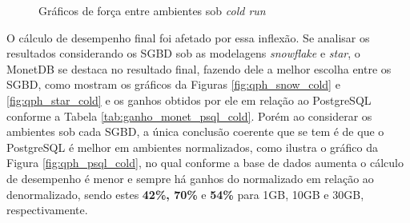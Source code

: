 \begin{figure}[htpb]
        \centering
        \caption{Gráficos de força entre ambientes sob \textit{cold run}}
        \label{fig:power_cold}
\end{figure}

O cálculo de desempenho final foi afetado por essa inflexão. Se analisar os resultados considerando os SGBD sob as modelagens \textit{snowflake} e \textit{star}, o MonetDB se destaca no resultado final, fazendo dele a melhor escolha entre os SGBD, como mostram os gráficos da Figuras \ref{fig:qph_snow_cold} e \ref{fig:qph_star_cold} e os ganhos obtidos por ele em relação ao PostgreSQL conforme a Tabela \ref{tab:ganho_monet_psql_cold}. Porém ao considerar os ambientes sob cada SGBD, a única conclusão coerente que se tem é de que o PostgreSQL é melhor em ambientes normalizados, como ilustra o gráfico da Figura \ref{fig:qph_psql_cold}, no qual conforme a base de dados aumenta o cálculo de desempenho é menor e sempre há ganhos do normalizado em relação ao denormalizado, sendo estes \textbf{42\%, 70\%} e \textbf{54\%} para 1GB, 10GB e 30GB, respectivamente.

